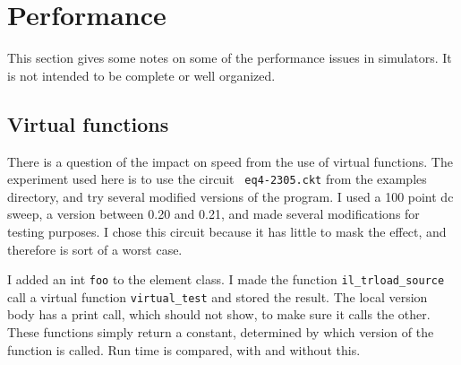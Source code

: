%
%
%
%
\section{Performance}
This section gives some notes on some of the performance issues in
simulators.  It is not intended to be complete or well organized.
\subsection{Virtual functions}

There is a question of the impact on speed from the use of virtual
functions.  The experiment used here is to use the circuit {\tt
eq4-2305.ckt} from the examples directory, and try several modified
versions of the program.  I used a 100 point dc sweep, a version
between 0.20 and 0.21, and made several modifications for testing
purposes.  I chose this circuit because it has little to mask the
effect, and therefore is sort of a worst case.

I added an int {\tt foo} to the element class.  I made the function
{\tt il\_trload\_source} call a virtual function {\tt virtual\_test}
and stored the result.  The local version body has a print call,
which should not show,  to make sure it calls the other.  These
functions simply return a constant, determined by which version of
the function is called.  Run time is compared, with and without
this.

